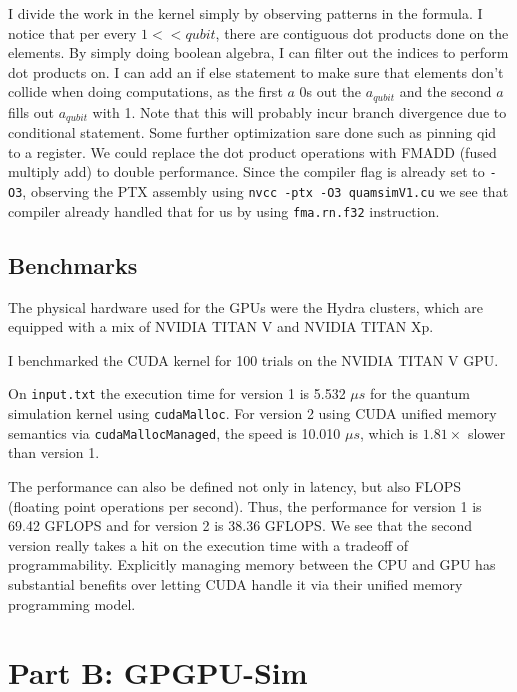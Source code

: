 \documentclass{article}
\begin{document}
I divide the work in the kernel simply by observing patterns in the formula. I notice that per every $1 << qubit$, there are contiguous dot products done on the elements. By simply doing boolean algebra, I can filter out the indices to perform dot products on. I can add an if else statement to make sure that elements don't collide when doing computations, as the first $a$ 0s out the $a_{qubit}$ and the second $a$ fills out $a_{qubit}$ with 1. Note that this will probably incur branch divergence due to conditional statement. Some further optimization sare done such as pinning qid to a register. We could replace the dot product operations with FMADD (fused multiply add) to double performance. Since the compiler flag is already set to \verb|-O3|, observing the PTX assembly using \verb|nvcc -ptx -O3 quamsimV1.cu| we see that compiler already handled that for us by using \verb|fma.rn.f32| instruction.

\subsection{Benchmarks}
The physical hardware used for the GPUs were the Hydra clusters, which are equipped with a mix of NVIDIA TITAN V and NVIDIA TITAN Xp.

I benchmarked the CUDA kernel for 100 trials on the NVIDIA TITAN V GPU.

On \verb|input.txt| the execution time for version 1 is 5.532 $\mu s$ for the quantum simulation kernel using \verb|cudaMalloc|. For version 2 using CUDA unified memory semantics via \verb|cudaMallocManaged|, the speed is 10.010 $\mu s$, which is $1.81 \times$ slower than version 1.

The performance can also be defined not only in latency, but also FLOPS (floating point operations per second). Thus, the performance for version 1 is 69.42 GFLOPS and for version 2 is 38.36 GFLOPS. We see that the second version really takes a hit on the execution time with a tradeoff of programmability. Explicitly managing memory between the CPU and GPU has substantial benefits over letting CUDA handle it via their unified memory programming model.  

\section{Part B: GPGPU-Sim}
\end{document}
